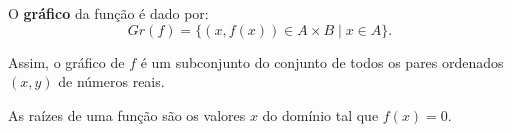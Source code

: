 O \textbf{gráfico} da função é dado por:
\begin{equation*}
Gr(f) = \{ (x, f(x)) \in A \times B \mid x \in A\}.
\end{equation*}

Assim, o gráfico de $f$ é um subconjunto do conjunto de todos os pares ordenados $(x,y)$ de números reais.

\begin{obs}
    As raízes de uma função são os valores $x$ do domínio tal que $f(x)=0$.
\end{obs}







